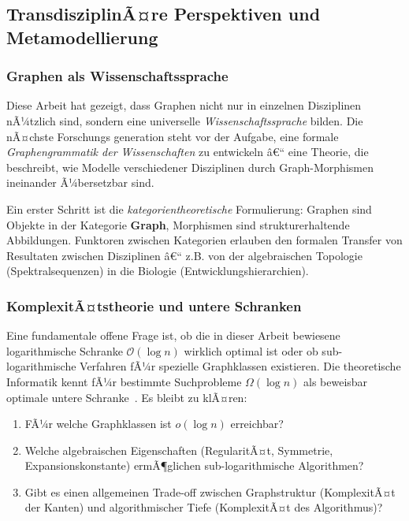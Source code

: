 ﻿\documentclass[12pt,a4paper,twoside]{article}
\theoremstyle{definition}
\theoremstyle{plain}
\theoremstyle{remark}
\begin{document}
\subsection{TransdisziplinÃ¤re Perspektiven und Metamodellierung}

\subsubsection{Graphen als Wissenschaftssprache}

Diese Arbeit hat gezeigt, dass Graphen nicht nur in
einzelnen Disziplinen nÃ¼tzlich sind, sondern eine universelle
\emph{Wissenschaftssprache} bilden.  Die nÃ¤chste Forschungs\-
generation steht vor der Aufgabe, eine formale
\emph{Graphengrammatik der Wissenschaften} zu entwickeln â€“
eine Theorie, die beschreibt, wie Modelle verschiedener
Disziplinen durch Graph-Morphismen~\cite{Ehrig2006}
ineinander Ã¼bersetzbar sind.

Ein erster Schritt ist die \emph{kategorientheoretische}
Formulierung: Graphen sind Objekte in der Kategorie
\textbf{Graph}, Morphismen sind strukturerhaltende
Abbildungen.  Funktoren zwischen Kategorien erlauben
den formalen Transfer von Resultaten zwischen Disziplinen â€“
z.B. von der algebraischen Topologie (Spektralsequenzen)
in die Biologie (Entwicklungshierarchien).

\subsubsection{KomplexitÃ¤tstheorie und untere Schranken}

Eine fundamentale offene Frage ist, ob die in dieser Arbeit
bewiesene logarithmische Schranke $\mathcal{O}(\log n)$
wirklich optimal ist oder ob sub-logarithmische Verfahren
fÃ¼r spezielle Graphklassen existieren.  Die theoretische
Informatik kennt fÃ¼r bestimmte Suchprobleme
$\Omega(\log n)$ als beweisbar optimale untere Schranke~\cite{Hromkovic2004}.
Es bleibt zu klÃ¤ren:
\begin{enumerate}
	\item FÃ¼r welche Graphklassen ist $o(\log n)$ erreichbar?
	\item Welche algebraischen Eigenschaften (RegularitÃ¤t,
	Symmetrie, Expansionskonstante) ermÃ¶glichen
	sub-logarithmische Algorithmen?
	\item Gibt es einen allgemeinen Trade-off zwischen
	Graphstruktur (KomplexitÃ¤t der Kanten) und
	algorithmischer Tiefe (KomplexitÃ¤t des Algorithmus)?
\end{enumerate}
\end{document}
